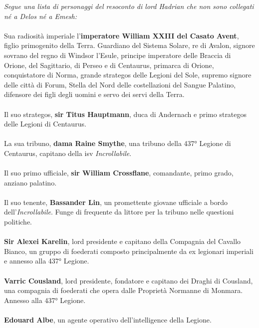 \textit{Segue una lista di personaggi del resoconto di lord Hadrian che non sono
collegati né a Delos né a Emesh:}
\leavevmode\\
\leavevmode\\
Sua radiosità imperiale l'\textbf{imperatore William XXIII del Casato
	Avent}, figlio primogenito della Terra. Guardiano del Sistema Solare, re
di Avalon, signore sovrano del regno di Windsor l'Esule, principe
imperatore delle Braccia di Orione, del Sagittario, di Perseo e di
Centaurus, primarca di Orione, conquistatore di Norma, grande strategos
delle Legioni del Sole, supremo signore delle città di Forum, Stella del
Nord delle costellazioni del Sangue Palatino, difensore dei figli degli
uomini e servo dei servi della Terra.
\leavevmode\\
\leavevmode\\
\phantom{123}Il suo strategos, \textbf{sir Titus Hauptmann}, duca di Andernach e
primo strategos delle Legioni di Centaurus.
\leavevmode\\
\leavevmode\\
\phantom{123}La sua tribuno, \textbf{dama Raine Smythe}, una tribuno della 437°
Legione di Centaurus, capitano della \foreignlanguage{italian}{isv}
\emph{Incrollabile}.
\leavevmode\\
\leavevmode\\
\phantom{123}Il suo primo ufficiale, \textbf{sir William Crossflane}, comandante,
primo grado, anziano palatino.
\leavevmode\\
\leavevmode\\
\phantom{123}Il suo tenente, \textbf{Bassander Lin}, un promettente giovane ufficiale
a bordo dell'\emph{Incrollabile}. Funge di frequente da littore per la
tribuno nelle questioni politiche.
\leavevmode\\
\leavevmode\\
\phantom{123}\textbf{Sir Alexei Karelin}, lord presidente e capitano della Compagnia
del Cavallo Bianco, un gruppo di foederati composto principalmente da ex
legionari imperiali e annesso alla 437° Legione.
\leavevmode\\
\leavevmode\\
\phantom{123}\textbf{Varric Cousland}, lord presidente, fondatore e capitano dei
Draghi di Cousland, una compagnia di foederati che opera dalle Proprietà
Normanne di Monmara. Annesso alla 437° Legione.
\leavevmode\\
\leavevmode\\
\phantom{123}\textbf{Edouard Albe}, un agente operativo dell'intelligence della
Legione.

